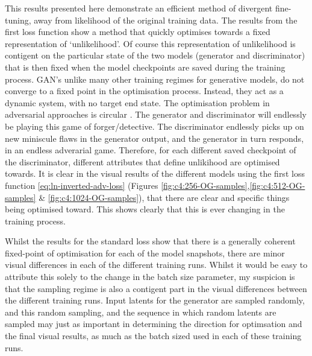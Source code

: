 This results presented here demonstrate an efficient method of divergent fine-tuning, away from likelihood of the original training data. 
The results from the first loss function show a method that quickly optimises towards a fixed representation of `unlikelihood'.
Of course this representation of unlikelihood is contigent on the particular state of the two models (generator and discriminator) that is then fixed when the model checkpoints are saved during the training process.
GAN's unlike many other training regimes for generative models,  do not converge to a fixed point in the optimisation process.
Instead, they act as a dynamic system, with no target end state. 
The optimisation problem in adversarial approaches is circular \citep{nagarajan2017gradient}. 
The generator and discriminator will endlessly be playing this game of forger/detective. 
The discriminator endlessly picks up on new miniscule flaws in the generator output, and the generator in turn responds, in an endless adverarial game.
Therefore, for each different saved checkpoint of the discriminator, different attributes that define unlikihood are optimised towards.
It is clear in the visual results of the different models using the first loss function \ref{eq:ln-inverted-adv-loss} (Figures \ref{fig:c4:256-OG-samples},\ref{fig:c4:512-OG-samples} \& \ref{fig:c4:1024-OG-samples}), that there are clear and specific things being optimised toward.
This shows clearly that this is ever changing in the training process.

Whilst the results for the standard loss show that there is a generally coherent fixed-point of optimisation for each of the model snapshots, there are minor visual differences in each of the different training runs.
Whilst it would be easy to attribute this solely to the change in the batch size parameter, my suspicion is that the sampling regime is also a contigent part in the visual differences between the different training runs.
Input latents for the generator are sampled randomly, and this random sampling, and the sequence in which random latents are sampled may just as important in determining the direction for optimsation and the final visual results, as much as the batch sized used in each of these training runs. 

